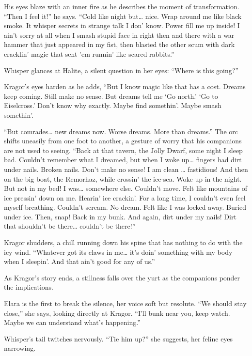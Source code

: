 \documentclass[
  letterpaper,12pt,twoside,twocolumn,openany,
  nodeprecatedcode,bg=full]{dndbook}
\begin{document}
His eyes blaze with an inner fire as he describes the moment of
transformation. ``Then I feel it!'' he says. ``Cold like night
but\ldots{} nice. Wrap around me like black smoke. It whisper secrets in
strange talk I don' know. Power fill me up inside! I ain't sorry at all
when I smash stupid face in right then and there with a war hammer that
just appeared in my fist, then blasted the other scum with dark
cracklin' magic that sent 'em runnin' like scared rabbits.''

Whisper glances at Halite, a silent question in her eyes: ``Where is
this going?''

Kragor's eyes harden as he adds, ``But I know magic like that has a
cost. Dreams keep coming. Still make no sense. But dreams tell me `Go
north.' `Go to Eiselcross.' Don't know why exactly. Maybe find
somethin'. Maybe smash somethin'.

``But comrades\ldots{} new dreams now. Worse dreams. More than dreams.''
The orc shifts uneasily from one foot to another, a gesture of worry
that his companions are not used to seeing. ``Back at that tavern, the
Jolly Dwarf, some night I sleep bad. Couldn't remember what I dreamed,
but when I woke up\ldots{} fingers had dirt under nails. Broken nails.
Don't make no sense! I am clean \ldots{} fastidious! And then on the big
boat, the Remorhaz, while crossin' the ice-sea. Woke up in the night.
But not in my bed! I was\ldots{} somewhere else. Couldn't move. Felt
like mountains of ice pressin' down on me. Hearin' ice crackin'. For a
long time, I couldn't even feel myself breathing. Couldn't scream. No
dream. Felt like I was locked away. Buried under ice. Then, snap! Back
in my bunk. And again, dirt under my nails! Dirt that shouldn't be
there\ldots{} couldn't be there!''

Kragor shudders, a chill running down his spine that has nothing to do
with the icy wind. ``Whatever got its claws in me\ldots{} it's doin'
something with my body when I sleepin'. And that ain't good for any of
us.''

As Kragor's story ends, a stillness falls over the yurt as the
companions ponder the implications.

Elara is the first to break the silence, her voice soft but resolute.
``We should stay close,'' she says, looking directly at Kragor. ``I'll
bunk near you, keep watch. Maybe we can understand what's happening.''

Whisper's tail twitches nervously. ``Tie him up?'' she suggests, her
feline eyes narrowing.
\end{document}
